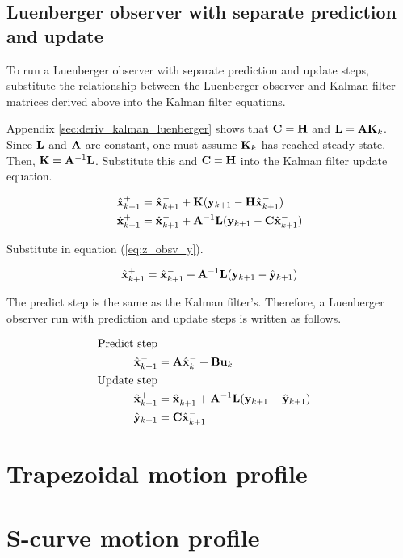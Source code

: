 \subsection{Luenberger observer with separate prediction and update}
\label{subsec:deriv_luenberger_separate}

To run a Luenberger \gls{observer} with separate prediction and update steps,
substitute the relationship between the Luenberger \gls{observer} and Kalman
filter matrices derived above into the Kalman filter equations.

Appendix \ref{sec:deriv_kalman_luenberger} shows that $\mathbf{C} = \mathbf{H}$ and
$\mathbf{L} = \mathbf{A}\mathbf{K}_k$. Since $\mathbf{L}$ and $\mathbf{A}$ are constant, one
must assume $\mathbf{K}_k$ has reached steady-state. Then,
$\mathbf{K} = \mathbf{A}^{-1}\mathbf{L}$. Substitute this and $\mathbf{C} = \mathbf{H}$ into
the Kalman filter update equation.

\begin{align*}
  \hat{\mathbf{x}}_{k+1}^+ &= \hat{\mathbf{x}}_{k+1}^- + \mathbf{K}(\mathbf{y}_{k+1} -
    \mathbf{H}\hat{\mathbf{x}}_{k+1}^-) \\
  \hat{\mathbf{x}}_{k+1}^+ &= \hat{\mathbf{x}}_{k+1}^- + \mathbf{A}^{-1}\mathbf{L}
    (\mathbf{y}_{k+1} - \mathbf{C}\hat{\mathbf{x}}_{k+1}^-)
\end{align*}

Substitute in equation (\ref{eq:z_obsv_y}).

\begin{equation*}
  \hat{\mathbf{x}}_{k+1}^+ = \hat{\mathbf{x}}_{k+1}^- + \mathbf{A}^{-1}\mathbf{L}
    (\mathbf{y}_{k+1} - \hat{\mathbf{y}}_{k+1})
\end{equation*}

The predict step is the same as the Kalman filter's. Therefore, a Luenberger
\gls{observer} run with prediction and update steps is written as follows.

\begin{align}
  \text{Predict step} \nonumber \\
  \hat{\mathbf{x}}_{k+1}^- &= \mathbf{A}\hat{\mathbf{x}}_k^- + \mathbf{B}\mathbf{u}_k \\
  \text{Update step} \nonumber \\
  \hat{\mathbf{x}}_{k+1}^+ &= \hat{\mathbf{x}}_{k+1}^- + \mathbf{A}^{-1}\mathbf{L}
    (\mathbf{y}_{k+1} - \hat{\mathbf{y}}_{k+1}) \\
  \hat{\mathbf{y}}_{k+1} &= \mathbf{C} \hat{\mathbf{x}}_{k+1}^-
\end{align}

\section{Trapezoidal motion profile}
\label{sec:deriv_trapezoid_profile}

\section{S-curve motion profile}
\label{sec:deriv_s-curve_profile}
